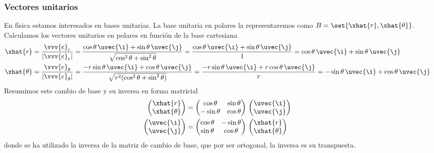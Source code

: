 \subsubsection{Vectores unitarios}
En física estamos interesados en bases unitarias. La base unitaria en polares la
representaremos como $B=\set{\xhat{r}, \xhat{\theta}}$.
Calculamos los vectores unitarios en polares en función de la base cartesiana
{\small
\begin{subequations}
  \begin{align}\label{eq:R2-versor-r}
    \xhat{r}
    &= \dfrac{\vvv{e}_r}{|\vvv{e}_r|}
    =\dfrac{\cos\theta\,\uvec{\i}+\sin\theta\,\uvec{\j}}
    {\sqrt{\cos^2\theta+\sin^2\theta}}
    = \dfrac{\cos\theta\,\uvec{\i}+\sin\theta\,\uvec{\j}}{1}
      = \cos\theta\,\uvec{\i} + \sin\theta\,\uvec{\j}\\
    \label{eq:R2-versor-theta}
  \xhat{\theta}
  &= \dfrac{\vvv{e}_\theta}{|\vvv{e}_\theta|}
  = \dfrac{-r\sin\theta\,\uvec{\i}+\cos\theta\,\uvec{\j}}
  {\sqrt{r^2(\cos^2\theta+\sin^2\theta)}}
  = \dfrac{-r\sin\theta\,\uvec{\i}+r\cos\theta\,\uvec{\j}}{r}
  = -\sin\theta\,\uvec{\i} + \cos\theta\,\uvec{\j}
  \end{align}
\end{subequations}
}
Resumimos este cambio de base y su inversa en forma matricial
\begin{subequations}
\begin{align}
  \begin{pmatrix}
    \xhat{r}\\
    \xhat{\theta}
  \end{pmatrix}
  &=
  \begin{pmatrix}
    \cos\theta & \sin\theta\\
    -\sin\theta & \cos\theta
  \end{pmatrix}
  \,
  \begin{pmatrix}
    \uvec{\i}\\
    \uvec{\j}
  \end{pmatrix}\\
\begin{pmatrix}
    \uvec{\i}\\
    \uvec{\j}
  \end{pmatrix}
  &=
  \begin{pmatrix}
    \cos\theta & -\sin\theta\\
    \sin\theta & \cos\theta
  \end{pmatrix}
  \,
  \begin{pmatrix}
    \xhat{r}\\
    \xhat{\theta}
  \end{pmatrix} 
\end{align}
\end{subequations}
donde se ha utilizado la inversa de la matriz de cambio de base, que por ser ortogonal,
la inversa es su transpuesta.

